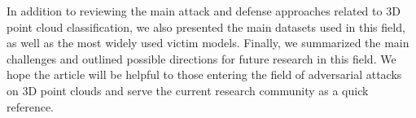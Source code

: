 \documentclass{ieeeaccess}
\begin{document}
In addition to reviewing the main attack and defense approaches related to 3D point cloud classification, we also presented the main datasets used in this field, as well as the most widely used victim models. Finally, we summarized the main challenges and outlined possible directions for future research in this field. We hope the article will be helpful to those entering the field of adversarial attacks on 3D point clouds and serve the current research community as a quick reference.









    
    
    
    
    
    
    
\end{document}
